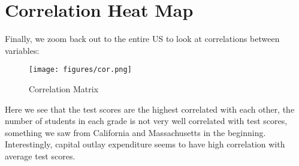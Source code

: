 \documentclass[
]{article}
\begin{document}
\section{Correlation Heat Map}
Finally, we zoom back out to the entire US to look at correlations between variables:
\begin{figure}[!ht]
	\centering
	\texttt{[image: figures/cor.png]}
	\caption{Correlation Matrix}
\end{figure} 
Here we see that the test scores are the highest correlated with each other, the number of students in each grade is not very well correlated with test scores, something we saw from California and Massachusetts in the beginning. Interestingly, capital outlay expenditure seems to have high correlation with average test scores.
\end{document}
